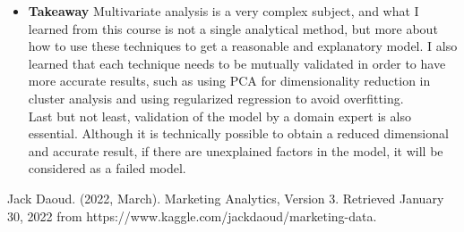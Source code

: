 \documentclass[11pt]{article} %
\begin{document}
\begin{itemize}
\item \textbf{Takeaway}
\newline
Multivariate analysis is a very complex subject, and what I learned from this course is not a single analytical method, but more about how to use these techniques to get a reasonable and explanatory model. I also learned that each technique needs to be mutually validated in order to have more accurate results, such as using PCA for dimensionality reduction in cluster analysis and using regularized regression to avoid overfitting.
\\
Last but not least, validation of the model by a domain expert is also essential. Although it is technically possible to obtain a reduced dimensional and accurate result, if there are unexplained factors in the model, it will be considered as a failed model.

\end{itemize}

\clearpage
%   

\begin{thebibliography}{9}


Jack Daoud. (2022, March). Marketing Analytics, Version 3. Retrieved January 30, 2022 from https://www.kaggle.com/jackdaoud/marketing-data.
\end{thebibliography}


\clearpage
\end{document}
